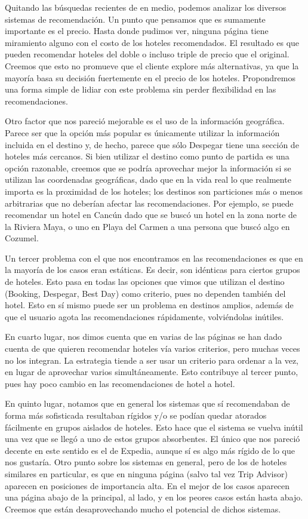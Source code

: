 \documentclass[12pt]{report}
\begin{document}
Quitando las búsquedas recientes de en medio, podemos analizar los diversos sistemas de recomendación. Un punto que pensamos que es sumamente importante es el precio. Hasta donde pudimos ver, ninguna página tiene miramiento alguno con el costo de los hoteles recomendados. El resultado es que pueden recomendar hoteles del doble o incluso triple de precio que el original. Creemos que esto no promueve que el cliente explore más alternativas, ya que la mayoría basa su decisión fuertemente en el precio de los hoteles. Propondremos una forma simple de lidiar con este problema sin perder flexibilidad en las recomendaciones.

Otro factor que nos pareció mejorable es el uso de la información geográfica. Parece ser que la opción más popular es únicamente utilizar la información incluida en el destino y, de hecho, parece que sólo Despegar tiene una sección de hoteles más cercanos. Si bien utilizar el destino como punto de partida es una opción razonable, creemos que se podría aprovechar mejor la información si se utilizan las coordenadas geográficas, dado que en la vida real lo que realmente importa es la proximidad de los hoteles; los destinos son particiones más o menos arbitrarias que no deberían afectar las recomendaciones. Por ejemplo, se puede recomendar un hotel en Cancún dado que se buscó un hotel en la zona norte de la Riviera Maya, o uno en Playa del Carmen a una persona que buscó algo en Cozumel. 

Un tercer problema con el que nos encontramos en las recomendaciones es que en la mayoría de los casos eran estáticas. Es decir, son idénticas para ciertos grupos de hoteles. Esto pasa en todas las opciones que vimos que utilizan el destino (Booking, Despegar, Best Day) como criterio, pues no dependen también del hotel. Esto en sí mismo puede ser un problema en destinos amplios, además de que el usuario agota las recomendaciones rápidamente, volviéndolas inútiles. 

En cuarto lugar, nos dimos cuenta que en varias de las páginas se han dado cuenta de que quieren recomendar hoteles vía varios criterios, pero muchas veces no los integran. La estrategia tiende a ser usar un criterio para ordenar a la vez, en lugar de aprovechar varios simultáneamente. Esto contribuye al tercer punto, pues hay poco cambio en las recomendaciones de hotel a hotel.

En quinto lugar, notamos que en general los sistemas que sí recomendaban de forma más sofisticada resultaban rígidos y/o se podían quedar atorados fácilmente en grupos aislados de hoteles. Esto hace que el sistema se vuelva inútil una vez que se llegó a uno de estos grupos absorbentes. El único que nos pareció decente en este sentido es el de Expedia, aunque sí es algo más rígido de lo que nos gustaría. Otro punto sobre los sistemas en general, pero de los de hoteles similares en particular, es que en ninguna página (salvo tal vez Trip Advisor) aparecen en posiciones de importancia alta. En el mejor de los casos aparecen una página abajo de la principal, al lado, y en los peores casos están hasta abajo. Creemos que están desaprovechando mucho el potencial de dichos sistemas.
\end{document}

